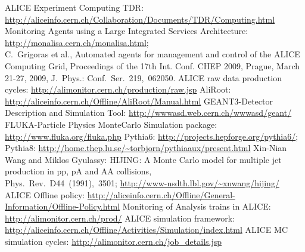 \begin{thebibliography}{100}
%
%
 ALICE Experiment Computing TDR:
\newline\url{http://aliceinfo.cern.ch/Collaboration/Documents/TDR/Computing.html}
%
%
 Monitoring Agents using a Large Integrated Services
Architecture:
\newline\url{http://monalisa.cern.ch/monalisa.html};\\
         C.~Grigoras et al., Automated agents for management and control of the ALICE Computing Grid,
         Proceedings of the 17th Int. Conf. CHEP 2009,
         Prague, March 21-27, 2009, J.~Phys.: Conf.~Ser.~219,~062050.
%
 ALICE raw data production cycles:
\newline\url{http://alimonitor.cern.ch/production/raw.jsp}
%
 AliRoot: \url{http://aliceinfo.cern.ch/Offline/AliRoot/Manual.html}
%
 GEANT3-Detector Description and Simulation Tool:
\newline\url{http://wwwasd.web.cern.ch/wwwasd/geant/}
%
 FLUKA-Particle Physics MonteCarlo Simulation package:
\newline\url{http://www.fluka.org/fluka.php}
%
 Pythia6: \url{http://projects.hepforge.org/pythia6/};\\
Pythia8: \url{http://home.thep.lu.se/~torbjorn/pythiaaux/present.html}
%
 Xin-Nian Wang and Miklos Gyulassy: HIJING: A Monte Carlo model for
multiple jet production in pp, pA and AA collisions,\\ Phys.~Rev.~D44~(1991),~3501;
         \newline\url{http://www-nsdth.lbl.gov/~xnwang/hijing/}
%
 ALICE Offline policy:
\newline\url{http://aliceinfo.cern.ch/Offline/General-Information/Offline-Policy.html}
%
 Monitoring of Analysis trains in ALICE:
\newline\url{http://alimonitor.cern.ch/prod/}
%
 ALICE simulation framework:
\newline\url{http://aliceinfo.cern.ch/Offline/Activities/Simulation/index.html}
%
 ALICE MC simulation cycles:
\newline\url{http://alimonitor.cern.ch/job_details.jsp}
%


\end{thebibliography}
